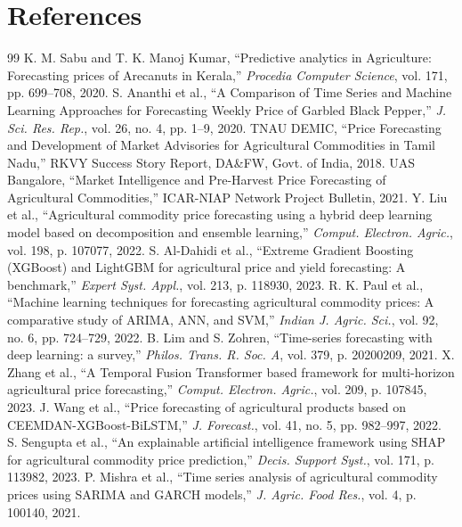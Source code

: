 \documentclass[journal,10pt,twocolumn]{IEEEtran}
\begin{document}
\section{References}

\begin{thebibliography}{99}
 K. M. Sabu and T. K. Manoj Kumar, ``Predictive analytics in Agriculture: Forecasting prices of Arecanuts in Kerala,'' \textit{Procedia Computer Science}, vol. 171, pp. 699--708, 2020.
 S. Ananthi et al., ``A Comparison of Time Series and Machine Learning Approaches for Forecasting Weekly Price of Garbled Black Pepper,'' \textit{J. Sci. Res. Rep.}, vol. 26, no. 4, pp. 1--9, 2020.
 TNAU DEMIC, ``Price Forecasting and Development of Market Advisories for Agricultural Commodities in Tamil Nadu,'' RKVY Success Story Report, DA\&FW, Govt. of India, 2018.
 UAS Bangalore, ``Market Intelligence and Pre-Harvest Price Forecasting of Agricultural Commodities,'' ICAR-NIAP Network Project Bulletin, 2021.
 Y. Liu et al., ``Agricultural commodity price forecasting using a hybrid deep learning model based on decomposition and ensemble learning,'' \textit{Comput. Electron. Agric.}, vol. 198, p. 107077, 2022.
 S. Al-Dahidi et al., ``Extreme Gradient Boosting (XGBoost) and LightGBM for agricultural price and yield forecasting: A benchmark,'' \textit{Expert Syst. Appl.}, vol. 213, p. 118930, 2023.
 R. K. Paul et al., ``Machine learning techniques for forecasting agricultural commodity prices: A comparative study of ARIMA, ANN, and SVM,'' \textit{Indian J. Agric. Sci.}, vol. 92, no. 6, pp. 724--729, 2022.
 B. Lim and S. Zohren, ``Time-series forecasting with deep learning: a survey,'' \textit{Philos. Trans. R. Soc. A}, vol. 379, p. 20200209, 2021.
 X. Zhang et al., ``A Temporal Fusion Transformer based framework for multi-horizon agricultural price forecasting,'' \textit{Comput. Electron. Agric.}, vol. 209, p. 107845, 2023.
 J. Wang et al., ``Price forecasting of agricultural products based on CEEMDAN-XGBoost-BiLSTM,'' \textit{J. Forecast.}, vol. 41, no. 5, pp. 982--997, 2022.
 S. Sengupta et al., ``An explainable artificial intelligence framework using SHAP for agricultural commodity price prediction,'' \textit{Decis. Support Syst.}, vol. 171, p. 113982, 2023.
 P. Mishra et al., ``Time series analysis of agricultural commodity prices using SARIMA and GARCH models,'' \textit{J. Agric. Food Res.}, vol. 4, p. 100140, 2021.
\end{thebibliography}
\end{document}
